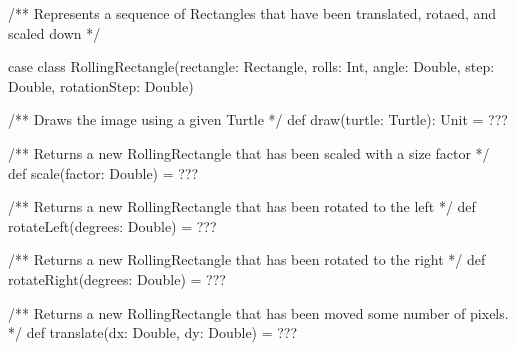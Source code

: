 \begin{ScalaSpec}
/** Represents a sequence of Rectangles that have been translated, rotaed, and scaled down */

case class RollingRectangle(rectangle: Rectangle,
                            rolls: Int,
                            angle: Double,
                            step: Double,
                            rotationStep: Double) {

  /** Draws the image using a given Turtle */
  def draw(turtle: Turtle): Unit = ???

  /** Returns a new RollingRectangle that has been scaled with a size factor */
  def scale(factor: Double) = ???

  /** Returns a new RollingRectangle that has been rotated to the left */
  def rotateLeft(degrees: Double) = ???

  /** Returns a new RollingRectangle that has been rotated to the right */
  def rotateRight(degrees: Double) = ???

  /** Returns a new RollingRectangle that has been moved some number of pixels. */
  def translate(dx: Double, dy: Double) = ???
}
\end{ScalaSpec}
